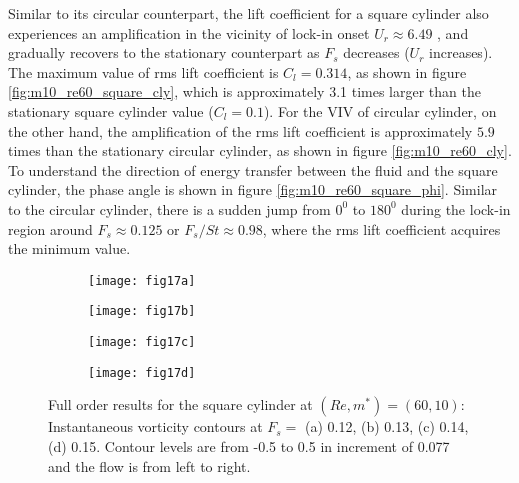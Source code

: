 \documentclass{jfm}
\begin{document}
Similar to its circular counterpart, the lift coefficient for a square cylinder 
also experiences an amplification 
in the vicinity of lock-in onset $U_r \approx 6.49$ 
, and gradually recovers to the stationary counterpart as $F_s$ decreases ($U_r$ increases). 
The maximum value of rms lift coefficient is $C_l=0.314$, as shown in figure \ref{fig:m10_re60_square_cly},  
which is approximately 3.1 times larger 
than the stationary square cylinder value ($C_l=0.1$).
For the VIV of circular cylinder, on the other hand, 
the amplification of the rms lift coefficient is approximately $5.9$ times than the stationary 
circular cylinder, as shown in figure \ref{fig:m10_re60_cly}.
%
To understand the direction of energy transfer between the fluid and the square cylinder, 
the phase angle is shown in figure \ref{fig:m10_re60_square_phi}. 
Similar to the circular cylinder, there is a sudden jump from $0^0$ to $180^0$ during the lock-in region around $F_s \approx 0.125$ or $F_s/St \approx 0.98$, where the rms lift coefficient 
acquires the minimum value. 
%


 
  \begin{figure}
\begin{subfigure}{0.495\textwidth}
\centering
    \texttt{[image: fig17a]}
    \caption{}
    \label{fig:m10_re60_square_vorfs120}
    \end{subfigure} 
\begin{subfigure}{0.495\textwidth} 
\centering
 \texttt{[image: fig17b]}
	\caption{}
	\label{fig:m10_re60_square_vorfs130}
	\end{subfigure}	
\begin{subfigure}{0.495\textwidth} 
\centering
 \texttt{[image: fig17c]}
	\caption{}
	\label{fig:m10_re60_square_vorfs140}
	\end{subfigure}	
\begin{subfigure}{0.495\textwidth} 
\centering
 \texttt{[image: fig17d]}
	\caption{}
	\label{fig:m10_re60_square_vorfs150}
	\end{subfigure}	
        \caption{Full order results for the square cylinder at  $(Re, m^*)=(60, 10)$:
         Instantaneous vorticity contours at $F_{s}=$ (a) 0.12, 
        (b) 0.13, (c) 0.14, (d) 0.15. Contour levels are from -0.5 to 0.5 in increment of 0.077 
        and the flow is from left to right.}
	\label{fig:vor_fs_square}
\end{figure}
\end{document}
